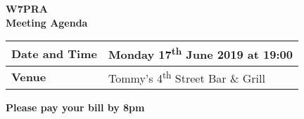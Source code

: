 \documentclass[letter,11pt]{extarticle}
\begin{document}
	\thispagestyle{empty}
	
	\begin{center}
		\textbf{W7PRA\\Meeting Agenda}
		\vspace{0.33cm}
	\end{center}
	
	\begin{center}
		\begin{tabular}{| m{3.0cm} | m{7.5cm} |} \hline
			\textbf{Date and Time} & Monday 17\textsuperscript{th} June 2019 at 19:00 \\ \hline
			\textbf{Venue} & Tommy's 4\textsuperscript{th} Street Bar \& Grill \\ \hline
				\end{tabular}
	\end{center}
	
	\begin{center}
		\textbf{Please pay your bill by 8pm}
	\end{center}
	
\end{document}
